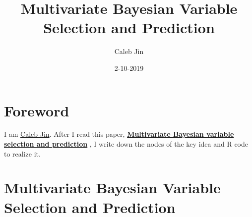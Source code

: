 \documentclass[]{book}
\title{Multivariate Bayesian Variable Selection and Prediction}
\author{Caleb Jin}
\date{2-10-2019}
\begin{document}
\maketitle

{
\setcounter{tocdepth}{1}
\tableofcontents
}
\hypertarget{foreword}{%
\chapter{Foreword}\label{foreword}}

I am \href{https://www.sjin.name/}{Caleb Jin}. After I read this paper, \textbf{\href{https://rss.onlinelibrary.wiley.com/doi/abs/10.1111/1467-9868.00144}{Multivariate Bayesian variable selection and prediction}} \citep{Brown}, I write down the nodes of the key idea and R code to realize it.

\newcommand\T{{\top}}
\newcommand\ubeta{{\boldsymbol \beta}}
\newcommand\uSigma{{\boldsymbol \Sigma}}
\newcommand\uepsilon{{\boldsymbol \epsilon}}
\newcommand\umu{{\boldsymbol \mu}}
\newcommand\utheta{{\boldsymbol \theta}}
\newcommand\ubg{{\boldsymbol \gamma}}
\newcommand\uphi{{\boldsymbol \phi}}
\newcommand\uxi{{\boldsymbol \xi}}

\newcommand\0{{\bf 0}}
\newcommand\uA{{\bf A}}
\newcommand\ua{{\bf a}}
\newcommand\uB{{\bf B}}
\newcommand\ub{{\bf b}}
\newcommand\uC{{\bf C}}
\newcommand\uD{{\bf D}}
\newcommand\uE{{\bf E}}
\newcommand\ue{{\bf e}}
\newcommand\uH{{\bf H}}
\newcommand\uI{{\bf I}}
\newcommand\uK{{\bf K}}
\newcommand\uM{{\bf M}}
\newcommand\uQ{{\bf Q}}
\newcommand\uV{{\bf V}}
\newcommand\uX{{\bf X}}
\newcommand\ux{{\bf x}}
\newcommand\uY{{\bf Y}}
\newcommand\uy{{\bf y}}
\newcommand\uz{{\bf z}}
\newcommand\diag{{\rm diag}}
\newcommand{\tr}{{\text tr}}

\hypertarget{multivariate-bayesian-variable-selection-and-prediction}{%
\chapter{Multivariate Bayesian Variable Selection and Prediction}\label{multivariate-bayesian-variable-selection-and-prediction}}
\end{document}
